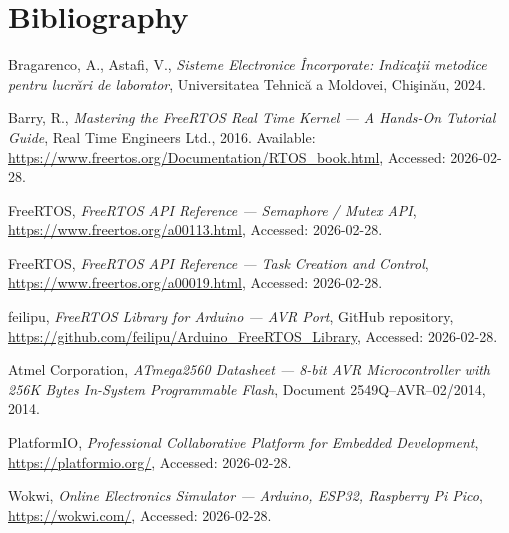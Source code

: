 \section{Bibliography}

\begin{enumerate}[label={[\arabic*]}]
    \item Bragarenco, A., Astafi, V., \textit{Sisteme Electronice \^{I}ncorporate: Indica\c{t}ii metodice pentru lucr\u{a}ri de laborator}, Universitatea Tehnic\u{a} a Moldovei, Chi\c{s}in\u{a}u, 2024.

    \item Barry, R., \textit{Mastering the FreeRTOS Real Time Kernel --- A Hands-On Tutorial Guide}, Real Time Engineers Ltd., 2016. Available: \url{https://www.freertos.org/Documentation/RTOS_book.html}, Accessed: 2026-02-28.

    \item FreeRTOS, \textit{FreeRTOS API Reference --- Semaphore / Mutex API}, \url{https://www.freertos.org/a00113.html}, Accessed: 2026-02-28.

    \item FreeRTOS, \textit{FreeRTOS API Reference --- Task Creation and Control}, \url{https://www.freertos.org/a00019.html}, Accessed: 2026-02-28.

    \item feilipu, \textit{FreeRTOS Library for Arduino --- AVR Port}, GitHub repository, \url{https://github.com/feilipu/Arduino_FreeRTOS_Library}, Accessed: 2026-02-28.

    \item Atmel Corporation, \textit{ATmega2560 Datasheet --- 8-bit AVR Microcontroller with 256K Bytes In-System Programmable Flash}, Document 2549Q--AVR--02/2014, 2014.

    \item PlatformIO, \textit{Professional Collaborative Platform for Embedded Development}, \url{https://platformio.org/}, Accessed: 2026-02-28.

    \item Wokwi, \textit{Online Electronics Simulator --- Arduino, ESP32, Raspberry Pi Pico}, \url{https://wokwi.com/}, Accessed: 2026-02-28.
\end{enumerate}
